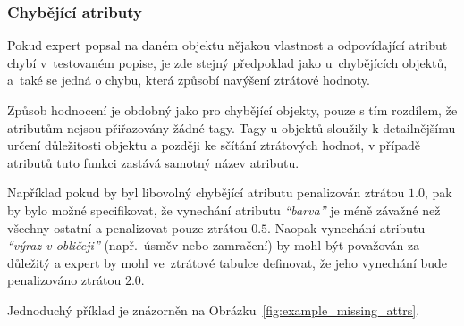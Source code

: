 \newpage
\subsubsection{Chybějící atributy}
Pokud expert popsal na daném objektu nějakou vlastnost a odpovídající atribut chybí v~testovaném popise,
je zde stejný předpoklad jako u~chybějících objektů, a~také se jedná o chybu, která způsobí navýšení ztrátové hodnoty.

Způsob hodnocení je obdobný jako pro chybějící objekty, pouze s tím rozdílem, že atributům nejsou přiřazovány žádné tagy.
Tagy u objektů sloužily k detailnějšímu určení důležitosti objektu a později ke sčítání ztrátových hodnot,
v případě atributů tuto funkci zastává samotný název atributu.

Například pokud by byl libovolný chybějící atributu penalizován ztrátou $1.0$, pak by bylo možné
specifikovat, že vynechání atributu \emph{\enquote{barva}} je méně závažné než všechny ostatní a penalizovat pouze ztrátou $0.5$.
Naopak vynechání atributu \emph{\enquote{výraz v obličeji}} (např.~úsměv nebo zamračení) by mohl být považován za důležitý a expert by
mohl ve~ztrátové tabulce definovat, že jeho vynechání bude penalizováno ztrátou $2.0$.

Jednoduchý příklad je znázorněn na Obrázku~\ref{fig:example_missing_attrs}.

